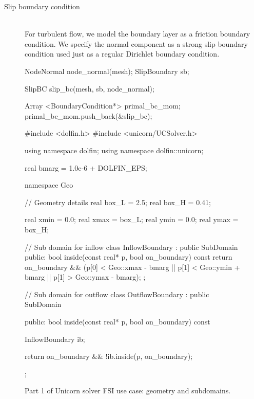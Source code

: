 \begin{description}
\begin{c++}
\end{c++}

\item[Slip boundary condition] \ \\ For turbulent flow, we model the
  boundary layer as a friction boundary condition. We specify the
  normal component as a strong slip boundary condition used just as a
  regular Dirichlet boundary condition.
\begin{c++}
NodeNormal node_normal(mesh);
SlipBoundary sb;

SlipBC slip_bc(mesh, sb, node_normal);

Array <BoundaryCondition*> primal_bc_mom;
primal_bc_mom.push_back(&slip_bc);
\end{c++}

\end{description}

\begin{figure}
\begin{c++}
#include <dolfin.h>
#include <unicorn/UCSolver.h>

using namespace dolfin;
using namespace dolfin::unicorn;

real bmarg = 1.0e-6 + DOLFIN_EPS;

namespace Geo
{
  // Geometry details
  real box_L = 2.5;
  real box_H = 0.41;

  real xmin = 0.0; real xmax = box_L;
  real ymin = 0.0; real ymax = box_H;
}

// Sub domain for inflow
class InflowBoundary : public SubDomain
{
public:
  bool inside(const real* p, bool on_boundary) const
  {
    return on_boundary && (p[0] < Geo::xmax - bmarg ||
                           p[1] < Geo::ymin + bmarg ||
                           p[1] > Geo::ymax - bmarg);
  }
};

// Sub domain for outflow
class OutflowBoundary : public SubDomain
{
public:
  bool inside(const real* p, bool on_boundary) const
  {
    InflowBoundary ib;

    return on_boundary && !ib.inside(p, on_boundary);
  }
};
\end{c++}
\caption{Part 1 of Unicorn solver FSI use case: geometry and subdomains.}
\label{code:UseCasePart1}
\end{figure}

